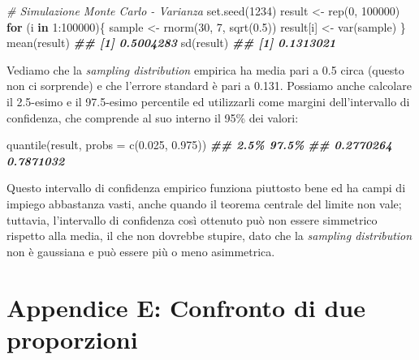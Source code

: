 \documentclass[
  12pt,
]{book}
\newenvironment{Shaded}{\begin{snugshade}}{\end{snugshade}}
\newcommand{\AttributeTok}[1]{\textcolor[rgb]{0.77,0.63,0.00}{#1}}
\newcommand{\CommentTok}[1]{\textcolor[rgb]{0.56,0.35,0.01}{\textit{#1}}}
\newcommand{\ControlFlowTok}[1]{\textcolor[rgb]{0.13,0.29,0.53}{\textbf{#1}}}
\newcommand{\DecValTok}[1]{\textcolor[rgb]{0.00,0.00,0.81}{#1}}
\newcommand{\DocumentationTok}[1]{\textcolor[rgb]{0.56,0.35,0.01}{\textbf{\textit{#1}}}}
\newcommand{\FloatTok}[1]{\textcolor[rgb]{0.00,0.00,0.81}{#1}}
\newcommand{\FunctionTok}[1]{\textcolor[rgb]{0.00,0.00,0.00}{#1}}
\newcommand{\NormalTok}[1]{#1}
\newcommand{\OtherTok}[1]{\textcolor[rgb]{0.56,0.35,0.01}{#1}}
\newcommand{\SpecialCharTok}[1]{\textcolor[rgb]{0.00,0.00,0.00}{#1}}
\begin{document}
\begin{Shaded}
\begin{Highlighting}[]
\CommentTok{\# Simulazione Monte Carlo {-} Varianza}
\FunctionTok{set.seed}\NormalTok{(}\DecValTok{1234}\NormalTok{)}
\NormalTok{result }\OtherTok{\textless{}{-}} \FunctionTok{rep}\NormalTok{(}\DecValTok{0}\NormalTok{, }\DecValTok{100000}\NormalTok{)}
\ControlFlowTok{for}\NormalTok{ (i }\ControlFlowTok{in} \DecValTok{1}\SpecialCharTok{:}\DecValTok{100000}\NormalTok{)\{}
\NormalTok{  sample }\OtherTok{\textless{}{-}} \FunctionTok{rnorm}\NormalTok{(}\DecValTok{30}\NormalTok{, }\DecValTok{7}\NormalTok{, }\FunctionTok{sqrt}\NormalTok{(}\FloatTok{0.5}\NormalTok{))}
\NormalTok{  result[i] }\OtherTok{\textless{}{-}} \FunctionTok{var}\NormalTok{(sample)}
\NormalTok{\}}
\FunctionTok{mean}\NormalTok{(result)}
\DocumentationTok{\#\# [1] 0.5004283}
\FunctionTok{sd}\NormalTok{(result)}
\DocumentationTok{\#\# [1] 0.1313021}
\end{Highlighting}
\end{Shaded}

Vediamo che la \emph{sampling distribution} empirica ha media pari a 0.5 circa (questo non ci sorprende) e che l'errore standard è pari a 0.131. Possiamo anche calcolare il 2.5-esimo e il 97.5-esimo percentile ed utilizzarli come margini dell'intervallo di confidenza, che comprende al suo interno il 95\% dei valori:

\begin{Shaded}
\begin{Highlighting}[]
\FunctionTok{quantile}\NormalTok{(result, }\AttributeTok{probs =} \FunctionTok{c}\NormalTok{(}\FloatTok{0.025}\NormalTok{, }\FloatTok{0.975}\NormalTok{))}
\DocumentationTok{\#\#      2.5\%     97.5\% }
\DocumentationTok{\#\# 0.2770264 0.7871032}
\end{Highlighting}
\end{Shaded}

Questo intervallo di confidenza empirico funziona piuttosto bene ed ha campi di impiego abbastanza vasti, anche quando il teorema centrale del limite non vale; tuttavia, l'intervallo di confidenza così ottenuto può non essere simmetrico rispetto alla media, il che non dovrebbe stupire, dato che la \emph{sampling distribution} non è gaussiana e può essere più o meno asimmetrica.

\hypertarget{appendice-e-confronto-di-due-proporzioni}{%
\chapter{Appendice E: Confronto di due proporzioni}\label{appendice-e-confronto-di-due-proporzioni}}
\end{document}
